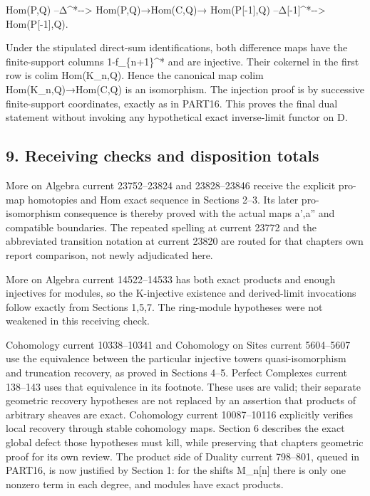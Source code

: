 \documentclass[11pt]{article}
\begin{document}
Hom(P,\allowbreak{}Q)\allowbreak{} --Δ\textasciicircum{}*-\allowbreak{}-> Hom(P,\allowbreak{}Q)\allowbreak{}\allowbreak{}→Hom(C,\allowbreak{}Q)\allowbreak{}\allowbreak{}→ Hom(P[-1]\allowbreak{},\allowbreak{}Q)\allowbreak{} --Δ[-1]\allowbreak{}\textasciicircum{}*-\allowbreak{}-> Hom(P[-1]\allowbreak{},\allowbreak{}Q)\allowbreak{}.

Under the stipulated direct-sum identifications,\allowbreak{} both difference maps have the finite-support columns 1-f\_\allowbreak{}\{n\allowbreak{}+1\}\textasciicircum{}* and are injective. Their cokernel in the first row is colim Hom(K\_\allowbreak{}n,\allowbreak{}Q)\allowbreak{}. Hence the canonical map colim Hom(K\_\allowbreak{}n,\allowbreak{}Q)\allowbreak{}\allowbreak{}→Hom(C,\allowbreak{}Q)\allowbreak{} is an isomorphism. The injection proof is by successive finite-support coordinates,\allowbreak{} exactly as in PART16. This proves the final dual statement without invoking any hypothetical exact inverse-limit functor on D.

\subsection{9. Receiving checks and disposition totals}\label{proofs-10435-10686-receiving-checks-and-disposition-totals}

More on Algebra current 23752–\allowbreak{}23824 and 23828–\allowbreak{}23846 receive the explicit pro-map homotopies and Hom exact sequence in Sections 2–\allowbreak{}3. Its later pro-isomorphism consequence is thereby proved with the actual maps a',\allowbreak{}a'' and compatible boundaries. The repeated spelling at current 23772 and the abbreviated transition notation at current 23820 are routed for that chapter\textquotesingle s own report comparison,\allowbreak{} not newly adjudicated here.

More on Algebra current 14522–\allowbreak{}14533 has both exact products and enough injectives for modules,\allowbreak{} so the K-injective existence and derived-limit invocations follow exactly from Sections 1,\allowbreak{}5,\allowbreak{}7. The ring-module hypotheses were not weakened in this receiving check.

Cohomology current 10338–\allowbreak{}10341 and Cohomology on Sites current 5604–\allowbreak{}5607 use the equivalence between the particular injective tower\textquotesingle s quasi-isomorphism and truncation recovery,\allowbreak{} as proved in Sections 4–\allowbreak{}5. Perfect Complexes current 138–\allowbreak{}143 uses that equivalence in its footnote. These uses are valid; their separate geometric recovery hypotheses are not replaced by an assertion that products of arbitrary sheaves are exact. Cohomology current 10087–\allowbreak{}10116 explicitly verifies local recovery through stable cohomology maps. Section 6 describes the exact global defect those hypotheses must kill,\allowbreak{} while preserving that chapter\textquotesingle s geometric proof for its own review. The product side of Duality current 798–\allowbreak{}801,\allowbreak{} queued in PART16,\allowbreak{} is now justified by Section 1:\allowbreak{} for the shifts M\_\allowbreak{}n[n]\allowbreak{} there is only one nonzero term in each degree,\allowbreak{} and modules have exact products.
\end{document}
